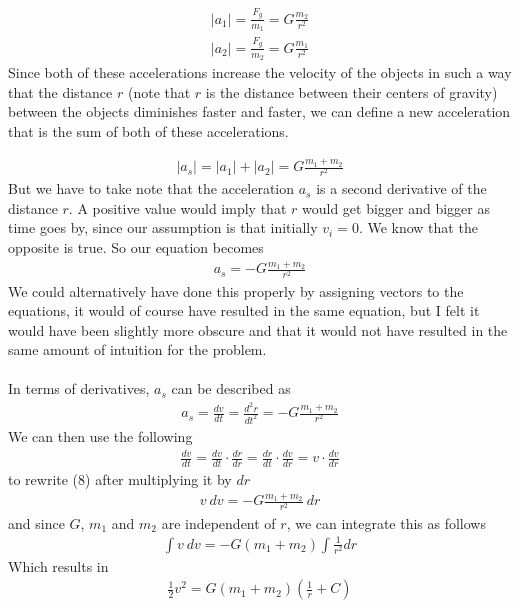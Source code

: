\documentclass{article}
\begin{document}
    \begin{align}
        |a_1| = \frac{F_g}{m_1} = G \frac{m_2}{r^2}\\
        |a_2| = \frac{F_g}{m_2} = G \frac{m_1}{r^2}
    \end{align}
    Since both of these accelerations increase the velocity of the objects in such a way that the distance $r$ (note that $r$ is the distance between their centers of gravity) between the objects diminishes faster and faster, we can define a new acceleration that is the sum of both of these accelerations.

\begin{align}
    |a_{s}| = |a_1| + |a_2| = G \frac{m_1 + m_2}{r^2}
\end{align}
    But we have to take note that the acceleration $a_s$ is a second derivative of the distance $r$. A positive value would imply that $r$ would get bigger and bigger as time goes by, since our assumption is that initially $v_i = 0$. We know that the opposite is true. So our equation becomes
\begin{align}
        a_s = -G \frac{m_1 + m_2}{r^2}
\end{align}
We could alternatively have done this properly by assigning vectors to the equations, it would of course have resulted in the same equation, but I felt it would have been slightly more obscure and that it would not have resulted in the same amount of intuition for the problem.\\
\\
In terms of derivatives, $a_s$ can be described as
\begin{align}
    a_s = \frac{dv}{dt} = \frac{d^2r}{dt^2} =  -G \frac{m_1 + m_2}{r^2}
\end{align}
We can then use the following
\begin{align}
    \frac{dv}{dt} = \frac{dv}{dt} \cdot \frac{dr}{dr} = \frac{dr}{dt} \cdot \frac{dv}{dr} = v \cdot \frac{dv}{dr}
\end{align}
to rewrite (8) after multiplying it by $dr$
\begin{align}
    v~{dv} = -G \frac{m_1 + m_2}{r^2}~dr
\end{align}
and since $G$, $m_1$ and $m_2$ are independent of $r$, we can integrate this as follows
\begin{align}
    \int{v~dv} = -G(m_1 + m_2) \int{\frac{1}{r^2} dr}
\end{align}
Which results in
\begin{align}
    \frac{1}{2}v^2 = G (m_1 + m_2) (\frac{1}{r} + C)
\end{align}
\end{document}
